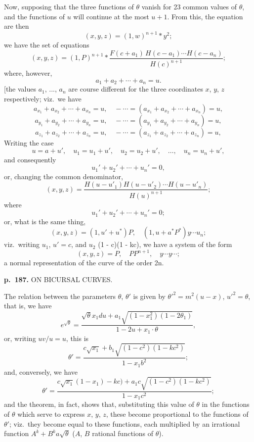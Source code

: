\documentclass[11pt,a4paper]{book}
\begin{document}
Now, supposing that the three functions of $\theta$ vanish for 23 common values of $\theta$, and the functions of $u$ will continue at the most $u + 1$. From this, the equation are then
\[
(x, y, z) = (1, w)^{n+1} \ast y^2;
\]
we have the set of equations
\[
(x, y, z) = (1, P)^{n+1} \ast \frac{F(c + a_1)\,H(c - a_1) \cdots H(c - a_n)}{H(c)^{n+1}};
\]
where, however,
\[
a_1 + a_2 + \cdots + a_n = u.
\]
[the values $a_1$, ..., $a_n$ are course different for the three coordinates $x$, $y$, $z$ respectively; viz.\ we have
\[
a_{x_1} + a_{x_2} + \cdots + a_{x_n} = u, \quad - \cdots = (a_{x_1} + a_{x_2} + \cdots + a_{x_n}) = u,
\]
\[
a_{y_1} + a_{y_2} + \cdots + a_{y_n} = u, \quad - \cdots = (a_{y_1} + a_{y_2} + \cdots + a_{y_n}) = u,
\]
\[
a_{z_1} + a_{z_2} + \cdots + a_{z_n} = u, \quad - \cdots = (a_{z_1} + a_{z_2} + \cdots + a_{z_n}) = u,
\]
Writing the case
\[
u = a + u', \quad u_1 = u_1 + u', \quad u_2 = u_2 + u', \quad \ldots, \quad u_n = u_n + u',
\]
and consequently
\[
u_1' + u_2' + \cdots + u_n' = 0,
\]
or, changing the common denominator,
\[
(x, y, z) = \frac{H(u - u'_1)H(u - u'_2)\cdots H(u - u'_n)}{H(u)^{n+1}};
\]
where
\[
u_1' + u_2' + \cdots + u_n' = 0;
\]
or, what is the same thing,
\[
(x, y, z) = (1, u' + u^*)P, \quad (1, u + a^*P^*)y \cdots u_n;
\]
viz.\ writing $u_1$, $u' = c$, and $u_2$ (1 - c)(1 - kc), we have a system of the form
\[
(x, y, z) = P, \quad PP^{n+1}, \quad y \cdots y \cdots;
\]
a normal representation of the curve of the order 2n.

\clearpage

\noindent
\textbf{p.~187.}  ON BICURSAL CURVES.

The relation between the parameters $\theta$, $\theta'$ is given by $\theta'^2 = m^2(u - x)$, $u'^2 = \theta$, that is, we have
\[
e^{\sqrt{\theta}} = \frac{\sqrt{\theta}x_1 du + a_1 \sqrt{(1 - x_1^2)(1 - 2\theta_1)}}{1 - 2u + x_1 \cdot \theta},
\]
or, writing $u v / u = u$, this is
\[
\theta' = \frac{c \sqrt{x_1} + b_1 \sqrt{(1 - c^2)(1 - kc^2)}}{1 - x_1 b^2};
\]
and, conversely, we have
\[
\theta' = \frac{c \sqrt{x_1}(1 - x_1) - kc) + a_1 c\sqrt{(1 - c^2)(1 - kc^2)}}{1 - x_1 c^2};
\]
and the theorem, in fact, shows that, substituting this value of $\theta$ in the functions of $\theta$ which serve to express $x$, $y$, $z$, these become proportional to the functions of $\theta'$; viz.\ they become equal to these functions, each multiplied by an irrational function $A^k + B^k a\sqrt{\theta}$ ($A$, $B$ rational functions of $\theta$).

\clearpage
\end{document}
